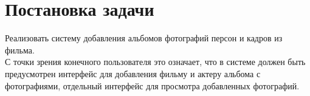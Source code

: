 ﻿\section{Постановка задачи}
Реализовать систему добавления альбомов фотографий персон и кадров из фильма.\\
\hspace*{0.25cm}С точки зрения конечного пользователя это означает, что в системе должен быть предусмотрен интерфейс для добавления фильму и актеру альбома с фотографиями, отдельный интерфейс для просмотра добавленных фотографий.

